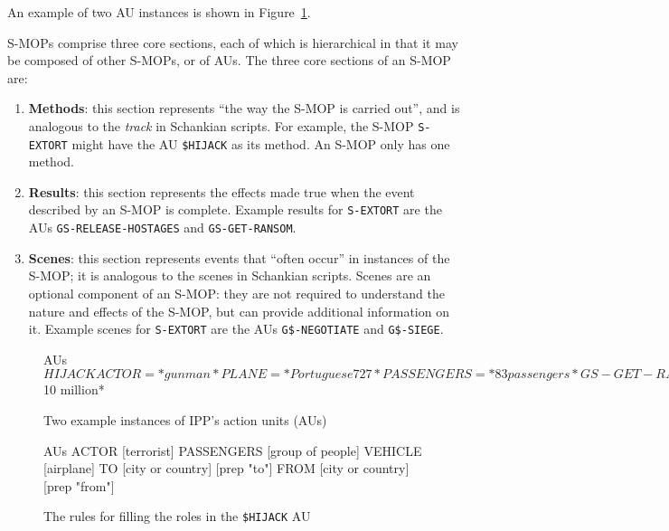 An example of two AU instances is shown in Figure~\ref{fig:ippaus}.

S-MOPs comprise three core sections, each of which is hierarchical in that it may be composed of other S-MOPs, or of AUs.
The three core sections of an S-MOP are:

\begin{enumerate}
    \item \textbf{Methods}: this section represents ``the way the S-MOP is carried out'', and is analogous to the \textit{track} in Schankian scripts. For example, the S-MOP \texttt{S-EXTORT} might have the AU \texttt{\$HIJACK} as its method. An S-MOP only has one method.
    
    \item \textbf{Results}: this section represents the effects made true when the event described by an S-MOP is complete. Example results for \texttt{S-EXTORT} are the AUs \texttt{GS-RELEASE-HOSTAGES} and \texttt{GS-GET-RANSOM}.
    
    \item \textbf{Scenes}: this section represents events that ``often occur'' in instances of the S-MOP; it is analogous to the scenes in Schankian scripts. Scenes are an optional component of an S-MOP: they are not required to understand the nature and effects of the S-MOP, but can provide additional information on it. Example scenes for \texttt{S-EXTORT} are the AUs \texttt{G\$-NEGOTIATE} and \texttt{G\$-SIEGE}.
\end{enumerate}


\begin{figure}
    \centering
  \begin{SaveVerbatim}{AUs}
$HIJACK
    ACTOR       = *gunman*
    PLANE       = *Portuguese 727*
    PASSENGERS  = *83 passengers*

GS-GET-RANSOM
    ACTOR       = *gunman*
    AMOUNT      = *$10 million*
\end{SaveVerbatim}
  \setlength{\fboxsep}{5mm}
    \caption{Two example instances of IPP's action units (AUs)}
    \label{fig:ippaus}
\end{figure}

\begin{figure}
    \centering
  \begin{SaveVerbatim}{AUs}
ACTOR       [terrorist]
PASSENGERS  [group of people]
VEHICLE     [airplane]
TO          [city or country] [prep "to"]
FROM        [city or country] [prep "from"]
\end{SaveVerbatim}
  \setlength{\fboxsep}{5mm}
    \caption{The rules for filling the roles in the \texttt{\$HIJACK} AU}
    \label{fig:ippaurolefill}
\end{figure}

